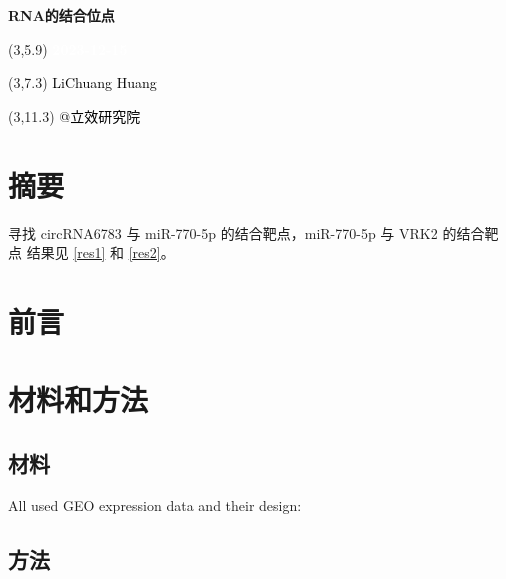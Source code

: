 \documentclass[
]{article}
\author{}
\date{\vspace{-2.5em}}
\begin{document}
\begin{titlepage} 
\begin{center} \textbf{\Huge RNA的结合位点}
\vspace{4em} \begin{textblock}{10}(3,5.9) \huge
\textbf{\textcolor{white}{2023-12-15}}
\end{textblock} \begin{textblock}{10}(3,7.3)
\Large \textcolor{black}{LiChuang Huang}
\end{textblock} \begin{textblock}{10}(3,11.3)
\Large \textcolor{black}{@立效研究院}
\end{textblock} \end{center} \end{titlepage}
\restoregeometry


\tableofcontents

\listoffigures

\listoftables

\newpage


\hypertarget{abstract}{%
\section{摘要}\label{abstract}}

寻找 circRNA6783 与 miR-770-5p 的结合靶点，miR-770-5p 与 VRK2 的结合靶点
结果见 \ref{res1} 和 \ref{res2}。

\hypertarget{introduction}{%
\section{前言}\label{introduction}}

\hypertarget{methods}{%
\section{材料和方法}\label{methods}}

\hypertarget{ux6750ux6599}{%
\subsection{材料}\label{ux6750ux6599}}

All used GEO expression data and their design:

\hypertarget{ux65b9ux6cd5}{%
\subsection{方法}\label{ux65b9ux6cd5}}
\end{document}
